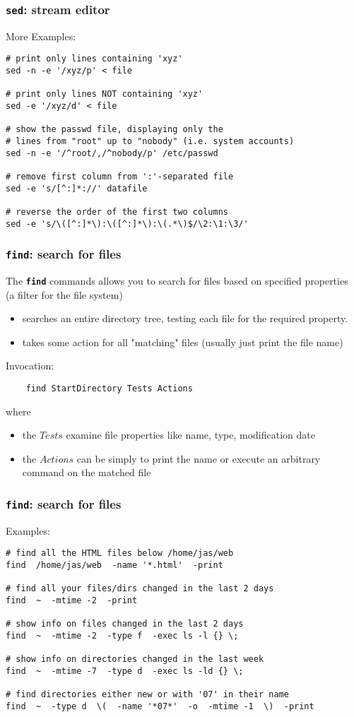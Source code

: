 \begin{frame}[fragile]
\frametitle{\textbf{\tt{sed}}: stream editor}
More Examples:
\begin{verbatim}
# print only lines containing 'xyz'
sed -n -e '/xyz/p' < file

# print only lines NOT containing 'xyz'
sed -e '/xyz/d' < file

# show the passwd file, displaying only the
# lines from "root" up to "nobody" (i.e. system accounts)
sed -n -e '/^root/,/^nobody/p' /etc/passwd
 
# remove first column from ':'-separated file
sed -e 's/[^:]*://' datafile

# reverse the order of the first two columns
sed -e 's/\([^:]*\):\([^:]*\):\(.*\)$/\2:\1:\3/'
\end{verbatim}

\end{frame}

\begin{frame}[fragile]
\frametitle{\textbf{\tt{find}}: search for files}
The \textbf{\tt{find}} commands allows you to search for files based on
specified properties
~ {\small (a filter for the file system)}
\begin{itemize}
\item  searches an entire directory tree, testing each file for the required property.
\item  takes some action for all "matching" files
        {\small (usually just print the file name)}
\end{itemize}
Invocation:
\begin{verbatim}
    find StartDirectory Tests Actions
\end{verbatim}

where
\begin{itemize}
\item  the $Tests$ examine file properties like name, type, modification date
\item  the $Actions$ can be simply to print the name or execute an arbitrary command on the matched file
\end{itemize}
\end{frame}

\begin{frame}[fragile]
\frametitle{\textbf{\tt{find}}: search for files}
Examples:
\begin{verbatim}
# find all the HTML files below /home/jas/web
find  /home/jas/web  -name '*.html'  -print

# find all your files/dirs changed in the last 2 days
find  ~  -mtime -2  -print

# show info on files changed in the last 2 days
find  ~  -mtime -2  -type f  -exec ls -l {} \;

# show info on directories changed in the last week
find  ~  -mtime -7  -type d  -exec ls -ld {} \;

# find directories either new or with '07' in their name
find  ~  -type d  \(  -name '*07*'  -o  -mtime -1  \)  -print
\end{verbatim}

\end{frame}

